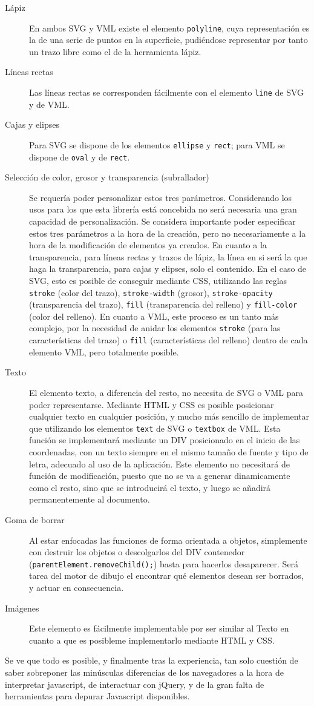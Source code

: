 \begin{description}
  \item[Lápiz] En ambos SVG y VML existe el elemento \texttt{polyline}, cuya representación es la de una serie de puntos en la superficie, pudiéndose representar por tanto un trazo libre como el de la herramienta lápiz.
  \item[Líneas rectas] Las líneas rectas se corresponden fácilmente con el elemento \texttt{line} de SVG y de VML. 
  \item[Cajas y elipses] Para SVG se dispone de los elementos \texttt{ellipse} y \texttt{rect}; para VML se dispone de \texttt{oval} y de \texttt{rect}.
  \item[Selección de color, grosor y transparencia (subrallador)] Se requería poder personalizar estos tres parámetros. Considerando los usos para los que esta librería está concebida no será necesaria una gran capacidad de personalización. Se considera importante poder especificar estos tres parámetros a la hora de la creación, pero no necesariamente a la hora de la modificación de elementos ya creados. En cuanto a la transparencia, para líneas rectas y trazos de lápiz, la línea en si será la que haga la transparencia, para cajas y elipses, solo el contenido. En el caso de SVG, esto es posible de conseguir mediante CSS, utilizando las reglas \texttt{stroke} (color del trazo), \texttt{stroke-width} (grosor), \texttt{stroke-opacity} (transparencia del trazo), \texttt{fill} (transparencia del relleno) y \texttt{fill-color} (color del relleno). En cuanto a VML, este proceso es un tanto más complejo, por la necesidad de anidar los elementos \texttt{stroke} (para las características del trazo) o \texttt{fill} (características del relleno) dentro de cada elemento VML, pero totalmente posible.
  \item[Texto] El elemento texto, a diferencia del resto, no necesita de SVG o VML para poder representarse. Mediante HTML y CSS es posible posicionar cualquier texto en cualquier posición, y mucho más sencillo de implementar que utilizando los elementos \texttt{text} de SVG o \texttt{textbox} de VML. Esta función se implementará mediante un DIV posicionado en el inicio de las coordenadas, con un texto siempre en el mismo tamaño de fuente y tipo de letra, adecuado al uso de la aplicación. Este elemento no necesitará de función de modificación, puesto que no se va a generar dinamicamente como el resto, sino que se introducirá el texto, y luego se añadirá permanentemente al documento.
  \item[Goma de borrar] Al estar enfocadas las funciones de forma orientada a objetos, simplemente con destruir los objetos o descolgarlos del DIV contenedor (\texttt{parentElement.removeChild();}) basta para hacerlos desaparecer. Será tarea del motor de dibujo el encontrar qué elementos desean ser borrados, y actuar en consecuencia.
  \item[Imágenes] Este elemento es fácilmente implementable por ser similar al Texto en cuanto a que es posibleme implementarlo mediante HTML y CSS.
\end{description}

Se ve que todo es posible, y finalmente tras la experiencia, tan solo cuestión de saber sobreponer las minúsculas diferencias de los navegadores a la hora de interpretar javascript, de interactuar con jQuery, y de la gran falta de herramientas para depurar Javascript disponibles.